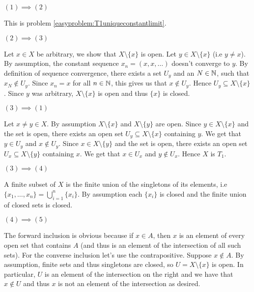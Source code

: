 \documentclass{article}
\begin{document}
 {
    $(1)\implies (2)$

    This is problem \ref{easyproblem:T1uniqueconstantlimit}.

    $(2)\implies (3)$

    Let $x\in X$ be arbitrary, we show that $X\setminus\{x\}$ is open. Let $y\in X\setminus\{x\}$ (i.e $y\neq x$). By assumption, the constant sequence $x_{n} = (x,x,\dots)$ doesn't converge to $y$. By definition of sequence convergence, there exists a set $U_{y}$ and an $N\in\mathbb{N}$, such that $x_{N}\not\in U_{y}$. Since $x_{n} = x$ for all $n\in \mathbb{N}$, this gives us that $x\not\in U_{y}$. Hence $U_{y}\subseteq X\setminus \{x\}$. Since $y$ was arbitrary, $X\setminus\{x\}$ is open and thus $\{x\}$ is closed. 

    $(3)\implies (1)$

    Let $x\neq y \in X$. By assumption $X\setminus\{x\}$ and $X\setminus\{y\}$ are open. Since $y\in X\setminus\{x\}$ and the set is open, there exists an open set $U_{y}\subseteq X\setminus\{x\}$ containing $y$. We get that $y\in U_{y}$ and $x\not\in U_{y}$. Since $x\in X\setminus\{y\}$ and the set is open, there exists an open set $U_{x}\subseteq X\setminus\{y\}$ containing $x$. We get that $x\in U_{x}$ and $y\not\in U_{x}$. Hence $X$ is $T_{1}$. 

    $(3)\implies (4)$

    A finite subset of $X$ is the finite union of the singletons of its elements, i.e $\{x_{1},\dots, x_{n}\} = \bigcup_{i = 1}^{n}\{x_{i}\}$. By assumption each $\{x_{i}\}$ is closed and the finite union of closed sets is closed.

    $(4)\implies (5)$

    The forward inclusion is obvious because if $x\in A$, then $x$ is an element of every open set that contains $A$ (and thus is an element of the intersection of all such sets). For the converse inclusion let's use the contrapositive. Suppose $x\not\in A$. By assumption, finite sets and thus singletons are closed, so $U = X\setminus\{x\}$ is open. In particular, $U$ is an element of the intersection on the right and we have that $x\not\in U$ and thus $x$ is not an element of the intersection as desired.

}
\end{document}
